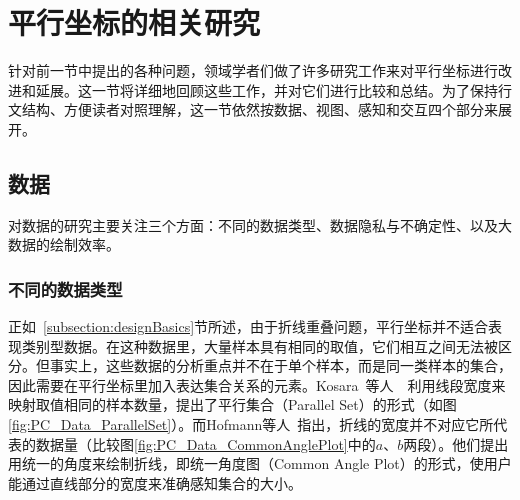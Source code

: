 \documentclass[12pt,twocolumn]{article}
\begin{document}
\section{平行坐标的相关研究}
\label{section:impro}

针对前一节中提出的各种问题，领域学者们做了许多研究工作来对平行坐标进行改进和延展。这一节将详细地回顾这些工作，并对它们进行比较和总结。为了保持行文结构、方便读者对照理解，这一节依然按数据、视图、感知和交互四个部分来展开。

\subsection{数据}
\label{subsection:dataImpro}

对数据的研究主要关注三个方面：不同的数据类型、数据隐私与不确定性、以及大数据的绘制效率。

\subsubsection{不同的数据类型}

正如~\ref{subsection:designBasics}节所述，由于折线重叠问题，平行坐标并不适合表现类别型数据。在这种数据里，大量样本具有相同的取值，它们相互之间无法被区分。但事实上，这些数据的分析重点并不在于单个样本，而是同一类样本的集合，因此需要在平行坐标里加入表达集合关系的元素。Kosara~等人~\citep{kosara2006parallel}~\citep{bendix2005parallel}利用线段宽度来映射取值相同的样本数量，提出了平行集合（Parallel Set）的形式（如图\ref{fig:PC_Data_ParallelSet}）。而Hofmann等人~\citep{hofmann2013common}指出，折线的宽度并不对应它所代表的数据量（比较图\ref{fig:PC_Data_CommonAnglePlot}中的$a$、$b$两段）。他们提出用统一的角度来绘制折线，即统一角度图（Common Angle Plot）的形式，使用户能通过直线部分的宽度来准确感知集合的大小。
\end{document}
